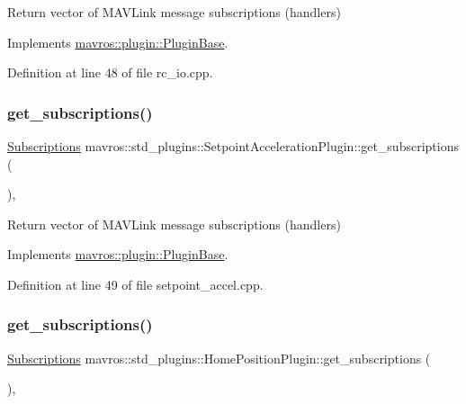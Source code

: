 Return vector of M\+A\+V\+Link message subscriptions (handlers) 



Implements \mbox{\hyperlink{group__plugin_gaf4e23fec6d7436a62cbf0942a2e5791c}{mavros\+::plugin\+::\+Plugin\+Base}}.



Definition at line 48 of file rc\+\_\+io.\+cpp.

\mbox{\label{group__plugin_ga07ccc1eddfa34ce64d9d61c1255ace1c}} 
\subsubsection{\texorpdfstring{get\_subscriptions()}{get\_subscriptions()}\hspace{0.1cm}{\footnotesize\ttfamily [15/41]}}
{\footnotesize\ttfamily \mbox{\hyperlink{group__plugin_ga8967d61fc77040e0c3ea5a4585d62a09}{Subscriptions}} mavros\+::std\+\_\+plugins\+::\+Setpoint\+Acceleration\+Plugin\+::get\+\_\+subscriptions (\begin{DoxyParamCaption}{ }\end{DoxyParamCaption})\hspace{0.3cm}{\ttfamily [inline]}, {\ttfamily [virtual]}}



Return vector of M\+A\+V\+Link message subscriptions (handlers) 



Implements \mbox{\hyperlink{group__plugin_gaf4e23fec6d7436a62cbf0942a2e5791c}{mavros\+::plugin\+::\+Plugin\+Base}}.



Definition at line 49 of file setpoint\+\_\+accel.\+cpp.

\mbox{\label{group__plugin_ga09ac4c0f6994b81c5e7f5b072f71e7d2}} 
\subsubsection{\texorpdfstring{get\_subscriptions()}{get\_subscriptions()}\hspace{0.1cm}{\footnotesize\ttfamily [16/41]}}
{\footnotesize\ttfamily \mbox{\hyperlink{group__plugin_ga8967d61fc77040e0c3ea5a4585d62a09}{Subscriptions}} mavros\+::std\+\_\+plugins\+::\+Home\+Position\+Plugin\+::get\+\_\+subscriptions (\begin{DoxyParamCaption}{ }\end{DoxyParamCaption})\hspace{0.3cm}{\ttfamily [inline]}, {\ttfamily [virtual]}}




